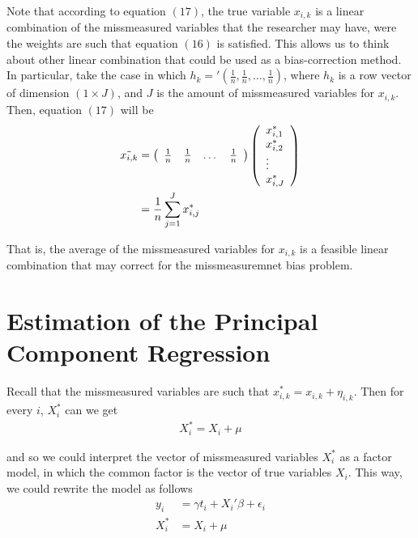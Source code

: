 \documentclass[10pt]{article}
\begin{document}
        Note that according to equation $(17)$, the true variable $x_{i,k}$ is a linear combination of the missmeasured variables that the researcher may have, were the weights are such that equation $(16)$ is satisfied. This allows us to think about other linear combination that could be used as a bias-correction method. In particular, take the case in which $h_k='(\frac{1}{n},\frac{1}{n},\dots,\frac{1}{n})$, where $h_k$ is a row vector of dimension $(1\times J)$, and $J$ is the amount of missmeasured variables for $x_{i,k}$. Then, equation $(17)$ will be
        \begin{align}
            \Tilde{x_{i,k}}&=\left(\begin{array}{cccc}
        \frac{1}{n} & \frac{1}{n} & \dots &\frac{1}{n} 
        \end{array}\right)\left(\begin{array}{l}
        x^*_{i,1} \\
        x^*_{i,2} \\
        \vdots \\
        x^*_{i,J} 
        \end{array}\right)\\
        &=\frac{1}{n}\sum_{j=1}^J x^*_{i,j}
        \end{align}
        
        That is, the average of the missmeasured variables for $x_{i,k}$ is a feasible linear combination that may correct for the missmeasuremnet bias problem.
        
        \section*{Estimation of the Principal Component Regression}
        
        Recall that the missmeasured variables are such that $x^*_{i,k}=x_{i,k}+\eta_{i,k}$. Then for every $i$, $X_i^*$ can we get
        \begin{align}
            X_i^* = X_i +\mu
        \end{align}
        
        and so we could interpret the vector of missmeasured variables $X^*_i$ as a factor model, in which the common factor is the vector of true variables $X_i$. This way, we could rewrite the model as follows
        \begin{align}
            y_i &= \gamma t_i + X_i'\beta + \epsilon_i \\
            X_i^* &= X_i +\mu
        \end{align}
        
\end{document}
